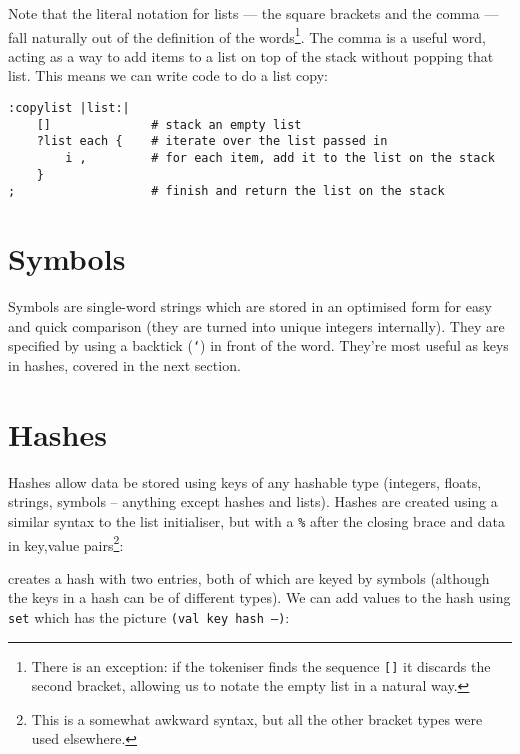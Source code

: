 Note that the literal notation for lists --- the square brackets and the
comma --- fall naturally out of the definition of the words\footnote{There
is an exception: if the tokeniser finds the sequence \texttt{[]} it discards
the second bracket, allowing us to notate the empty list in a natural way.}.
The comma
is a useful word, acting as a way to add items to a list on top of the stack
without popping that list. This means we can write code to do a list copy:
\begin{lstlisting}
:copylist |list:|
    []              # stack an empty list
    ?list each {    # iterate over the list passed in
        i ,         # for each item, add it to the list on the stack
    }
;                   # finish and return the list on the stack          
\end{lstlisting}

\section{Symbols}
Symbols are single-word strings which are stored in an optimised form for easy
and quick comparison (they are turned into unique integers
internally). They are specified by using a backtick (\texttt{`}) in front of
the word. They're most useful as keys in hashes, covered in the next section.

\section{Hashes}
Hashes allow data be stored using keys of any hashable type (integers, floats,
strings, symbols -- anything except hashes and lists). Hashes are created
using a similar syntax to the list initialiser, but with a \texttt{\%} after
the closing brace and data in key,value pairs\footnote{This is a somewhat
awkward syntax, but all the other bracket types were used elsewhere.}:
\end{v}
creates a hash with two entries, both of which are keyed by symbols (although
the keys in a hash can be of different types). We can add values to the hash
using \texttt{set} which has the picture \texttt{(val key hash --)}:

